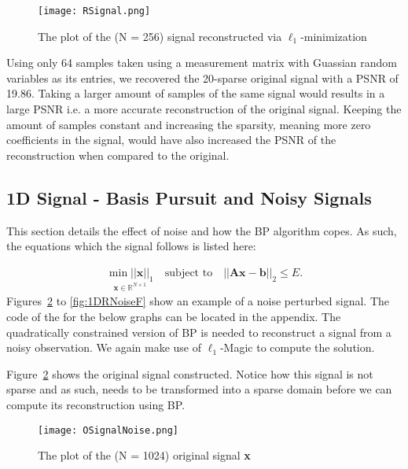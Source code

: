 \documentclass[titlepage,oneside, 12pt]{book}
\theoremstyle{break}
\begin{document}
\begin{figure}[H]
\centering
\centerline{\texttt{[image: RSignal.png]}}
\caption{The plot of the (N = 256) signal reconstructed via $\ell_1$-minimization}
\label{fig:1DR}
\end{figure}

Using only 64 samples taken using a measurement matrix with  Guassian random variables  as its entries, we recovered the 20-sparse original signal with a PSNR of 19.86. Taking a larger amount of samples of the same signal would results in a large PSNR i.e. a more accurate reconstruction of the original signal. Keeping the amount of samples constant and increasing the sparsity, meaning more zero coefficients in the signal, would have also increased the PSNR of the reconstruction when compared to the original. 


\newpage
\subsection{1D Signal - Basis Pursuit and Noisy Signals}

This section details the effect of noise and how the BP algorithm copes. As such, the equations which the signal follows is listed here:

\begin{equation}
\begin{gathered}
\underset{\textbf{x} \in \mathbb{R}^{N \times 1}}{\min ||\textbf{x}||_{1}} \quad \text{subject to} \quad ||\textbf{Ax} - \textbf{b}||_2 \leq E. 
\end{gathered}
\label{eqn:l1Quad2}
\end{equation}
Figures~\ref{fig:1DONoise} to \ref{fig:1DRNoiseF} show an example of a noise perturbed signal. The code of the for the below graphs can be located in the appendix. The quadratically constrained version of BP is needed to reconstruct a signal from a noisy observation. We again make use of $\ell_1$-Magic  to compute the solution. 

Figure~\ref{fig:1DONoise} shows the original signal  constructed. Notice how this signal is not sparse and as such, needs to be transformed into a sparse domain before we can compute its reconstruction using BP. 

\begin{figure}[H]
\centering
\centerline{\texttt{[image: OSignalNoise.png]}}
\caption{The plot of the (N = 1024) original signal \textbf{x}}
\label{fig:1DONoise}
\end{figure}
\end{document}
